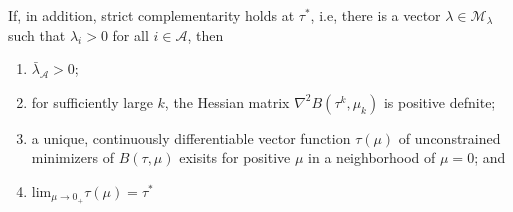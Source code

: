 \documentclass[14pt]{extreport}
\begin{document}
If, in addition, strict complementarity holds at $\tau^*$, i.e, there is a vector $\lambda \in \mathcal{M}_{\lambda}$ such that $\lambda_i > 0$ for all $i \in \mathcal{A}$, then
\begin{enumerate}[label=(\roman*)]
	\addtocounter{enumi}{3}
	\item $\bar{\lambda}_{\mathcal{A}} > 0$;
	\item for sufficiently large $k$, the Hessian matrix $\nabla^2 B(\tau^k, \mu_k)$ is positive defnite;
	\item a unique, continuously differentiable vector function $\tau(\mu)$ of unconstrained minimizers of $B(\tau,\mu)$ exisits for positive $\mu$ in a neighborhood of $\mu=0$; and 
	\item $\text{lim}_{\mu \to 0_{+}} \tau(\mu) = \tau^*$
\end{enumerate}
\end{document}
